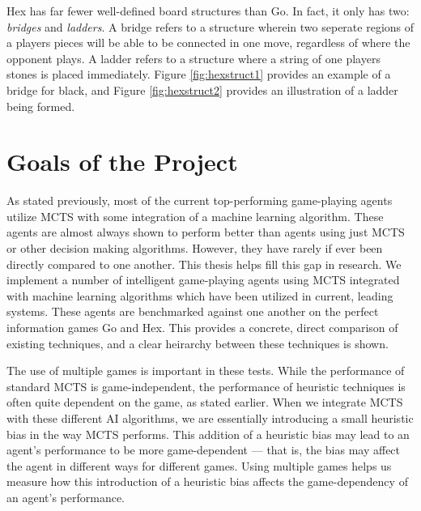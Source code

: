 Hex has far fewer well-defined board structures than Go.  In fact, it only has two: \textit{bridges} and \textit{ladders}.  A bridge refers to a structure wherein two seperate regions of a players pieces will be able to be connected in one move, regardless of where the opponent plays.  A ladder refers to a structure where a string of one players stones is placed immediately.  Figure \ref{fig:hexstruct1} provides an example of a bridge for black, and Figure \ref{fig:hexstruct2} provides an illustration of a ladder being formed.

\section{Goals of the Project}\label{sec:goals}
As stated previously, most of the current top-performing game-playing agents utilize MCTS with some integration of a machine learning algorithm.  These agents are almost always shown to perform better than agents using just MCTS or other decision making algorithms.  However, they have rarely if ever been directly compared to one another.  This thesis helps fill this gap in research.  We implement a number of intelligent game-playing agents using MCTS integrated with machine learning algorithms which have been utilized in current, leading systems. These agents are benchmarked against one another on the perfect information games Go and Hex.  This provides a concrete, direct comparison of existing techniques, and a clear heirarchy between these techniques is shown.

The use of multiple games is important in these tests.  While the performance of standard MCTS is game-independent, the performance of heuristic techniques is often quite dependent on the game, as stated earlier.  When we integrate MCTS with these different AI algorithms, we are essentially introducing a small heuristic bias in the way MCTS performs.  This addition of a heuristic bias may lead to an agent's performance to be more game-dependent --- that is, the bias may affect the agent in different ways for different games.  Using multiple games helps us measure how this introduction of a heuristic bias affects the game-dependency of an agent's performance.


